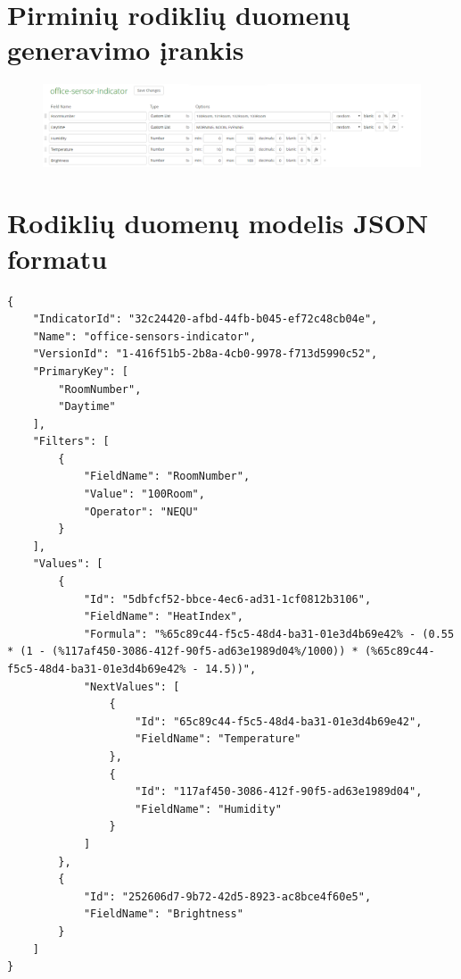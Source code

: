\documentclass{VUMIFPSbakalaurinis}
\begin{document}
\printbibliography[heading=bibintoc] 

\appendix 

\section{Pirminių rodiklių duomenų generavimo įrankis}\label{add:mockaroo}
\begin{figure}[H]
    \centering
    \includegraphics[width=1\textwidth]{img/generated-data.png}
    \label{img:generated-data}
\end{figure}

\section{Rodiklių duomenų modelis JSON formatu}\label{add:initial-json}
\begin{lstlisting}
{
    "IndicatorId": "32c24420-afbd-44fb-b045-ef72c48cb04e",
    "Name": "office-sensors-indicator",
    "VersionId": "1-416f51b5-2b8a-4cb0-9978-f713d5990c52",
    "PrimaryKey": [
        "RoomNumber",
        "Daytime"
    ],
    "Filters": [
        {
            "FieldName": "RoomNumber",
            "Value": "100Room",
            "Operator": "NEQU"
        }
    ],
    "Values": [
        {
            "Id": "5dbfcf52-bbce-4ec6-ad31-1cf0812b3106",
            "FieldName": "HeatIndex",
            "Formula": "%65c89c44-f5c5-48d4-ba31-01e3d4b69e42% - (0.55 * (1 - (%117af450-3086-412f-90f5-ad63e1989d04%/1000)) * (%65c89c44-f5c5-48d4-ba31-01e3d4b69e42% - 14.5))",
            "NextValues": [
                {
                    "Id": "65c89c44-f5c5-48d4-ba31-01e3d4b69e42",
                    "FieldName": "Temperature"
                },
                {
                    "Id": "117af450-3086-412f-90f5-ad63e1989d04",
                    "FieldName": "Humidity"
                }
            ]
        },
        {
            "Id": "252606d7-9b72-42d5-8923-ac8bce4f60e5",
            "FieldName": "Brightness"
        }
    ]
}
\end{lstlisting}
\end{document}

